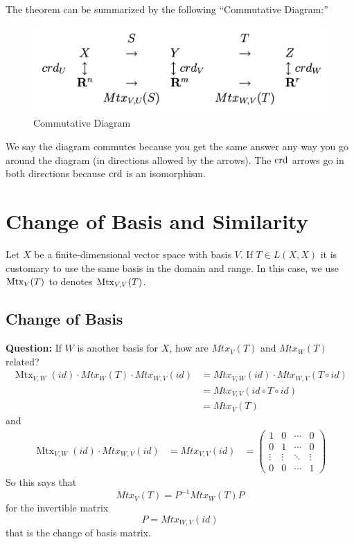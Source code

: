 \documentclass[11pt]{elegantbook}
\begin{document}
The theorem can be summarized by the following “Commutative Diagram:”
\begin{center}\begin{figure}[htbp]
    \centering
    \includegraphics[scale=0.25]{Commutative Diagram.png}
    \caption{Commutative Diagram}
    \label{}
\end{figure}\end{center}
We say the diagram commutes because you get the same answer any way you go around the diagram (in directions allowed by the arrows). The $\textnormal{crd}$ arrows go in both directions because $\textnormal{crd}$ is an isomorphism.


\section{Change of Basis and Similarity}
Let $X$ be a finite-dimensional vector space with basis $V$. If $T \in L(X, X)$ it is customary to use the same basis in the domain and range. In this case, we use $\textnormal{Mtx}_V(T)$ to denotes $\textnormal{Mtx}_{V,V}(T)$.

\subsection{Change of Basis}
\textbf{Question:} If $W$ is another basis for $X$, how are $M t x_V(T)$ and $M t x_W(T)$ related?
$$
\begin{aligned}
\operatorname{Mtx}_{V, W}(i d) \cdot M t x_W(T) \cdot M t x_{W, V}(i d) & =M t x_{V, W}(i d) \cdot M t x_{W, V}(T \circ i d) \\
& =M t x_{V, V}(i d \circ T \circ i d) \\
& =M t x_V(T)
\end{aligned}
$$
and
$$
\begin{aligned}
\operatorname{Mtx}_{V, W}(i d) \cdot M t x_{W, V}(i d) & =M t x_{V, V}(i d)
& =\left(\begin{array}{cccccc}
1 & 0  & \cdots & 0 \\
0 & 1  & \cdots & 0 \\
\vdots & \vdots & \ddots & \vdots \\
0 & 0 & \cdots & 1
\end{array}\right)
\end{aligned}
$$
So this says that
$$
M t x_V(T)=P^{-1} M t x_W(T) P
$$
for the invertible matrix
$$
P=M t x_{W, V}(i d)
$$
that is the change of basis matrix.
\end{document}
